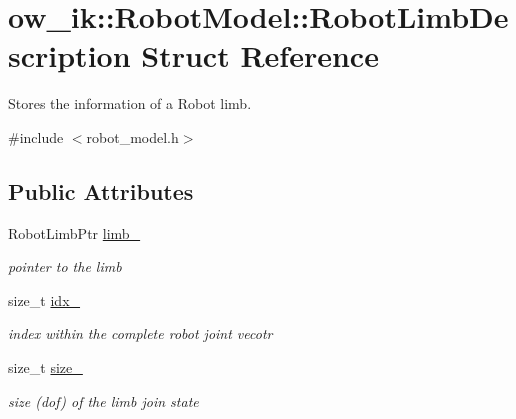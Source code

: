 \hypertarget{structow__ik_1_1RobotModel_1_1RobotLimbDescription}{}\section{ow\+\_\+ik\+:\+:Robot\+Model\+:\+:Robot\+Limb\+Description Struct Reference}
\label{structow__ik_1_1RobotModel_1_1RobotLimbDescription}


Stores the information of a Robot limb.  




{\ttfamily \#include $<$robot\+\_\+model.\+h$>$}

\subsection*{Public Attributes}
\begin{DoxyCompactItemize}
\item 
Robot\+Limb\+Ptr \hyperlink{structow__ik_1_1RobotModel_1_1RobotLimbDescription_af88dcdeca91dd19b9225b4a63c200ab4}{limb\+\_\+}\hypertarget{structow__ik_1_1RobotModel_1_1RobotLimbDescription_af88dcdeca91dd19b9225b4a63c200ab4}{}\label{structow__ik_1_1RobotModel_1_1RobotLimbDescription_af88dcdeca91dd19b9225b4a63c200ab4}

\begin{DoxyCompactList}\small\item\em pointer to the limb \end{DoxyCompactList}\item 
size\+\_\+t \hyperlink{structow__ik_1_1RobotModel_1_1RobotLimbDescription_aab08ba05f2b3dfa4e6d12ccf89c839f0}{idx\+\_\+}\hypertarget{structow__ik_1_1RobotModel_1_1RobotLimbDescription_aab08ba05f2b3dfa4e6d12ccf89c839f0}{}\label{structow__ik_1_1RobotModel_1_1RobotLimbDescription_aab08ba05f2b3dfa4e6d12ccf89c839f0}

\begin{DoxyCompactList}\small\item\em index within the complete robot joint vecotr \end{DoxyCompactList}\item 
size\+\_\+t \hyperlink{structow__ik_1_1RobotModel_1_1RobotLimbDescription_a2cf955d4a83eeb1c7544809a4f7369f2}{size\+\_\+}\hypertarget{structow__ik_1_1RobotModel_1_1RobotLimbDescription_a2cf955d4a83eeb1c7544809a4f7369f2}{}\label{structow__ik_1_1RobotModel_1_1RobotLimbDescription_a2cf955d4a83eeb1c7544809a4f7369f2}

\begin{DoxyCompactList}\small\item\em size (dof) of the limb join state \end{DoxyCompactList}\end{DoxyCompactItemize}


